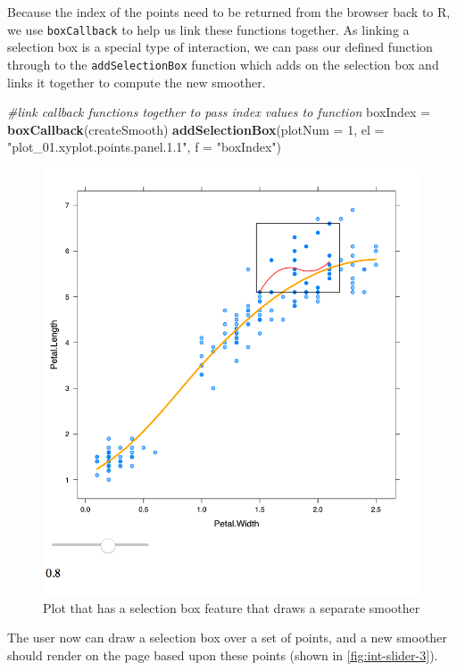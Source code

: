 \documentclass[11pt,]{report}
\newenvironment{Shaded}{\begin{snugshade}}{\end{snugshade}}
\newcommand{\KeywordTok}[1]{\textcolor[rgb]{0.13,0.29,0.53}{\textbf{#1}}}
\newcommand{\DataTypeTok}[1]{\textcolor[rgb]{0.13,0.29,0.53}{#1}}
\newcommand{\DecValTok}[1]{\textcolor[rgb]{0.00,0.00,0.81}{#1}}
\newcommand{\StringTok}[1]{\textcolor[rgb]{0.31,0.60,0.02}{#1}}
\newcommand{\CommentTok}[1]{\textcolor[rgb]{0.56,0.35,0.01}{\textit{#1}}}
\newcommand{\NormalTok}[1]{#1}
\begin{document}
Because the index of the points need to be returned from the browser
back to R, we use \texttt{boxCallback} to help us link these functions
together. As linking a selection box is a special type of interaction,
we can pass our defined function through to the \texttt{addSelectionBox}
function which adds on the selection box and links it together to
compute the new smoother.

\begin{Shaded}
\begin{Highlighting}[]
\CommentTok{#link callback functions together to pass index values to function}
\NormalTok{boxIndex =}\StringTok{ }\KeywordTok{boxCallback}\NormalTok{(createSmooth)}
\KeywordTok{addSelectionBox}\NormalTok{(}\DataTypeTok{plotNum =} \DecValTok{1}\NormalTok{, }\DataTypeTok{el =} \StringTok{"plot_01.xyplot.points.panel.1.1"}\NormalTok{, }\DataTypeTok{f =} \StringTok{"boxIndex"}\NormalTok{)}
\end{Highlighting}
\end{Shaded}

\begin{figure}[H]

{\centering \includegraphics[width=0.7\linewidth,]{./fig/int-slider-3} 

}

\caption{\label{fig:int-slider-3} Plot that has a selection box feature that draws a separate smoother}\label{fig:unnamed-chunk-77}
\end{figure}

The user now can draw a selection box over a set of points, and a new
smoother should render on the page based upon these points (shown in
\autoref{fig:int-slider-3}).
\end{document}
